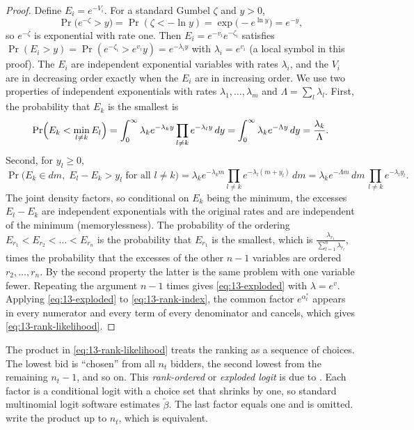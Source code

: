 \begin{proof}
Define $E_i = e^{-V_i}$. For a standard Gumbel $\zeta$ and $y > 0$,
\begin{equation*}
  \Pr\bigl(e^{-\zeta} > y\bigr) = \Pr(\zeta < -\ln y) = \exp\bigl(-e^{\ln y}\bigr) = e^{-y},
\end{equation*}
so $e^{-\zeta}$ is exponential with rate one. Then $E_i = e^{-v_i}e^{-\zeta_i}$ satisfies
$\Pr(E_i > y) = \Pr(e^{-\zeta_i} > e^{v_i}y) = e^{-\lambda_i y}$ with $\lambda_i = e^{v_i}$ (a local symbol in this
proof). The $E_i$ are
independent exponential variables with rates $\lambda_i$, and the $V_i$ are in decreasing order exactly when the
$E_i$ are in increasing order. We use two properties of independent exponentials with rates $\lambda_1, \dots,
\lambda_m$ and $\Lambda = \sum_l \lambda_l$. First, the probability that $E_k$ is the smallest is
\begin{equation*}
  \Pr\Bigl(E_k < \min_{l\neq k}E_l\Bigr) = \int_0^\infty \lambda_k e^{-\lambda_k y}\prod_{l\neq k}e^{-\lambda_l y}\,dy
  = \int_0^\infty \lambda_k e^{-\Lambda y}\,dy = \frac{\lambda_k}{\Lambda} .
\end{equation*}
Second, for $y_l \geq 0$,
\begin{equation*}
  \Pr\bigl(E_k \in dm,\; E_l - E_k > y_l \text{ for all } l \neq k\bigr)
  = \lambda_k e^{-\lambda_k m}\prod_{l\neq k}e^{-\lambda_l(m + y_l)}\,dm
  = \lambda_k e^{-\Lambda m}\,dm\,\prod_{l\neq k}e^{-\lambda_l y_l} .
\end{equation*}
The joint density factors, so conditional on $E_k$ being the minimum, the excesses $E_l - E_k$ are independent
exponentials with the original rates and are independent of the minimum (memorylessness). The probability of the
ordering $E_{r_1} < E_{r_2} < \dots < E_{r_n}$ is the probability that $E_{r_1}$ is the smallest, which is
$\frac{\lambda_{r_1}}{\sum_{l=1}^{n}\lambda_{r_l}}$, times the probability that the excesses of the other $n-1$
variables are ordered $r_2, \dots, r_n$. By the second property the latter is the same problem with one variable
fewer. Repeating the argument $n-1$ times gives \eqref{eq:13-exploded} with $\lambda = e^{v}$. Applying
\eqref{eq:13-exploded} to \eqref{eq:13-rank-index}, the common factor $e^{\alpha^{*}_t}$ appears in every numerator and
every term of every denominator and cancels, which gives \eqref{eq:13-rank-likelihood}.
\end{proof}

The product in \eqref{eq:13-rank-likelihood} treats the ranking as a sequence of choices. The lowest bid is
``chosen'' from all $n_t$ bidders, the second lowest from the remaining $n_t - 1$, and so on. This
\emph{rank-ordered} or \emph{exploded logit} is due to \citet{BeggsCardellHausman1981}. Each factor is a conditional
logit with a choice set that shrinks by one, so standard multinomial logit software estimates $\tilde\beta$. The
last factor equals one and is omitted. \citet{PorterZona1993} write the product up to $n_t$, which is equivalent.

